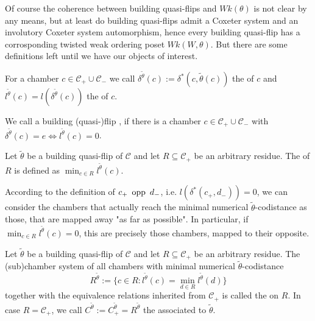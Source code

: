 Of course the coherence between building quasi-flips and $Wk(\theta)$ is not clear by any means, but at least do building quasi-flips admit a Coxeter system and an involutory Coxeter system automorphism, hence every building quasi-flip has a corrosponding twisted weak ordering poset $Wk(W,\theta)$. But there are some definitions left until we have our objects of interest.

\begin{defi}
	For a chamber $c \in \mathcal C_+ \cup \mathcal C_-$ we call $\delta^{\tilde \theta}(c) := \delta^*(c,\tilde \theta(c))$ the  of $c$ and $l^{\tilde \theta}(c) = l(\delta^{\tilde \theta}(c))$ the  of $c$.
\end{defi}

\begin{defi}
	We call a building (quasi-)flip , if there is a chamber $c \in \mathcal{C}_+ \cup \mathcal{C}_-$ with $\delta^{\tilde \theta}(c) = e \iff l^{\tilde \theta}(c) = 0$.
\end{defi}

\begin{defi}
	Let $\tilde \theta$ be a building quasi-flip of $\mathcal C$ and let $R \subseteq \mathcal C_+$ be an arbitrary residue. The  of $R$ is defined as $\min_{c \in R} l^{\tilde \theta}(c)$.
\end{defi}

According to the definition of $c_+ \opp d_-$, i.e. $l(\delta^*(c_+,d_-)) = 0$, we can consider the chambers that actually reach the minimal numerical $\tilde \theta$-codistance as those, that are mapped away "as far as possible". In particular, if $\min_{c \in R} l^{\tilde \theta}(c) = 0$, this are precisely those chambers, mapped to their opposite.

\begin{defi}
	Let $\tilde \theta$ be a building quasi-flip of $\mathcal C$ and let $R \subseteq \mathcal C_+$ be an arbitrary residue. The (sub)chamber system of all chambers with minimal numerical $\tilde \theta$-codistance
	$$ R^{\tilde \theta} := \{ c \in R : l^{\tilde \theta}(c) = \min_{d \in R} l^{\tilde \theta}(d) \} $$
	together with the equivalence relations inherited from $\mathcal C_+$ is called the  on $R$. In case $R = \mathcal C_+$, we call $C^{\tilde \theta} := C_+^{\tilde \theta} = R^{\tilde \theta}$ the  associated to $\tilde \theta$.
\end{defi}